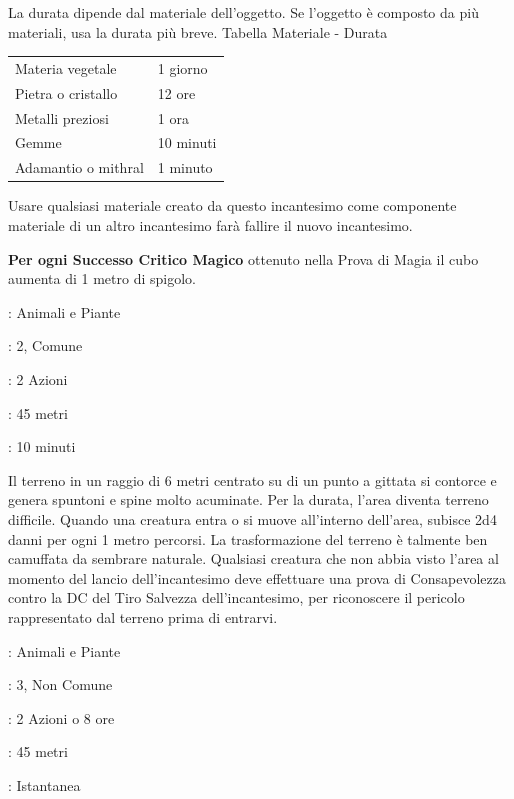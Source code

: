 \begin{multicols}{2}
La durata dipende dal materiale dell'oggetto. Se l'oggetto è composto da più materiali, usa la durata più breve.
\medskip
Tabella Materiale - Durata
\medskip

\noindent\begin{tabularx}{\linewidth}{lX}
	\toprule
	Materia vegetale &1 giorno\\
	Pietra o cristallo &12 ore\\
	Metalli preziosi &1 ora\\
	Gemme &10 minuti\\
	Adamantio o mithral &1 minuto
\end{tabularx}
\medskip

Usare qualsiasi materiale creato da questo incantesimo come componente materiale di un altro incantesimo farà fallire il nuovo incantesimo.

\textbf{Per ogni Successo Critico Magico} ottenuto nella Prova di Magia il cubo aumenta di 1 metro di spigolo.

\noindent\colorbox{OBSSgold!10}{
\begin{minipage}{0.95\linewidth}
\begin{description}[noitemsep, topsep=0pt, parsep=0pt, partopsep=0pt, leftmargin=0cm, labelwidth=1.3cm]
	\item[\textbf{Lista}]: Animali e Piante
	\item[\textbf{Livello}]: 2, Comune
	\item[\textbf{Lancio}]: 2 Azioni
	\item[\textbf{Gittata}]: 45 metri
	\item[\textbf{Durata}]: 10 minuti
\end{description}
\end{minipage}}\smallskip

Il terreno in un raggio di 6 metri centrato su di un punto a gittata si contorce e genera spuntoni e spine molto acuminate. Per la durata, l'area diventa terreno difficile. Quando una creatura entra o si muove all'interno dell'area, subisce 2d4 danni per ogni 1 metro percorsi.
La trasformazione del terreno è talmente ben camuffata da sembrare naturale. Qualsiasi creatura che non abbia visto l'area al momento del lancio dell'incantesimo deve effettuare una prova di Consapevolezza contro la DC del Tiro Salvezza dell'incantesimo, per riconoscere il pericolo rappresentato dal terreno prima di entrarvi.

\noindent\colorbox{OBSSgold!10}{
\begin{minipage}{0.95\linewidth}
\begin{description}[noitemsep, topsep=0pt, parsep=0pt, partopsep=0pt, leftmargin=0cm, labelwidth=1.3cm]
	\item[\textbf{Lista}]: Animali e Piante
	\item[\textbf{Livello}]: 3, Non Comune
	\item[\textbf{Lancio}]: 2 Azioni o 8 ore
	\item[\textbf{Gittata}]: 45 metri
	\item[\textbf{Durata}]: Istantanea
\end{description}
\end{minipage}}\smallskip


\end{multicols}
